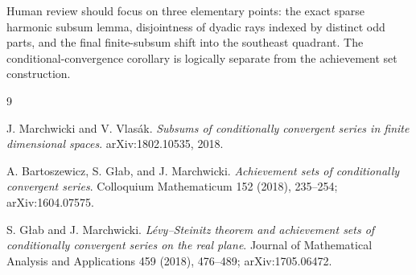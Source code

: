 \documentclass[11pt]{article}
\begin{document}
Human review should focus on three elementary points: the exact sparse
harmonic subsum lemma, disjointness of dyadic rays indexed by distinct odd
parts, and the final finite-subsum shift into the southeast quadrant.  The
conditional-convergence corollary is logically separate from the achievement
set construction.

\begin{thebibliography}{9}

J. Marchwicki and V. Vlas\'ak.
\emph{Subsums of conditionally convergent series in finite dimensional
spaces}.  arXiv:1802.10535, 2018.

A. Bartoszewicz, S. G\l ab, and J. Marchwicki.
\emph{Achievement sets of conditionally convergent series}.
Colloquium Mathematicum 152 (2018), 235--254; arXiv:1604.07575.

S. G\l ab and J. Marchwicki.
\emph{L\'evy--Steinitz theorem and achievement sets of conditionally
convergent series on the real plane}.
Journal of Mathematical Analysis and Applications 459 (2018), 476--489;
arXiv:1705.06472.

\end{thebibliography}
\end{document}
